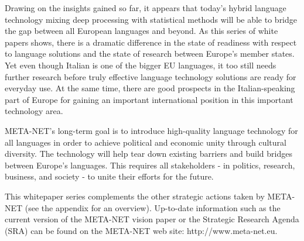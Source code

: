 \documentclass[]{../../metanetpaper}
\begin{document}
\begin{multicols}{2}

Drawing on the insights gained so far, it appears that today's hybrid
language technology mixing deep processing with statistical methods will be
able to bridge the gap between all European languages and beyond. As this
series of white papers shows, there is a dramatic difference in the state of
readiness with respect to language solutions and the state of research between
Europe's member states. Yet even though Italian is one of the bigger EU
languages, it too still needs further research before truly effective language
technology solutions are ready for everyday use. At the same time, there are
good prospects in the Italian-speaking part of Europe for gaining an important
international position in this important technology area.

META-NET's long-term goal is to introduce high-quality language technology
for all languages in order to achieve political and economic unity through
cultural diversity. The technology will help tear down existing barriers and
build bridges between Europe's languages. This requires all stakeholders -
in politics, research, business, and society - to unite their efforts for the
future.

This whitepaper series complements the other strategic actions taken by META-NET
(see the appendix for an overview). Up-to-date information such as the current
version of the META-NET vision paper \cite{Meta1} or the Strategic Research Agenda (SRA)
can be found on the META-NET web site: http://www.meta-net.eu.

\end{multicols}

\clearpage

\end{document}
